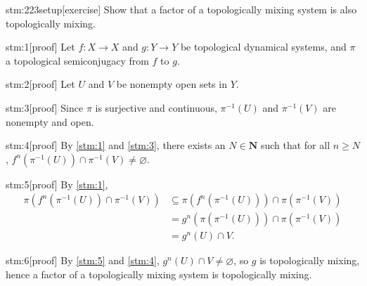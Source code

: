 \documentclass{article}
\begin{document}

\begin{stm}{stm:223setup}[exercise]
Show that a factor of a topologically mixing system is also topologically mixing.
\end{stm}


\begin{stm}{stm:1}[proof]
Let $f : X \to X$ and $g : Y \to Y$ be topological dynamical systems, and $\pi$ a topological semiconjugacy from $f$ to $g$.
\end{stm}

\begin{stm}{stm:2}[proof]
Let $U$ and $V$ be nonempty open sets in $Y$.
\end{stm}

\begin{stm}{stm:3}[proof]
Since $\pi$ is surjective and continuous, $\pi^{-1}(U)$ and $\pi^{-1}(V)$ are nonempty and open.
\end{stm}

\begin{stm}{stm:4}[proof]
By \ref{stm:1} and \ref{stm:3}, there exists an $N \in \mathbf{N}$ such that for all $n \geq N$, $f^n(\pi^{-1}(U)) \cap \pi^{-1}(V) \neq \varnothing$.
\end{stm}

\begin{stm}{stm:5}[proof]
By \ref{stm:1}, 
\begin{align*}
\pi\left(f^n(\pi^{-1}(U)) \cap \pi^{-1}(V)\right) 
&\subseteq \pi(f^n(\pi^{-1}(U))) \cap \pi(\pi^{-1}(V)) \\
&= g^n(\pi(\pi^{-1}(U))) \cap \pi(\pi^{-1}(V)) \\
&= g^n(U) \cap V.
\end{align*}
\end{stm}

\begin{stm}{stm:6}[proof]
By \ref{stm:5} and \ref{stm:4}, $g^n(U) \cap V \neq \varnothing$, so $g$ is topologically mixing, hence a factor of a topologically mixing system is topologically mixing.
\end{stm}
\end{document}
